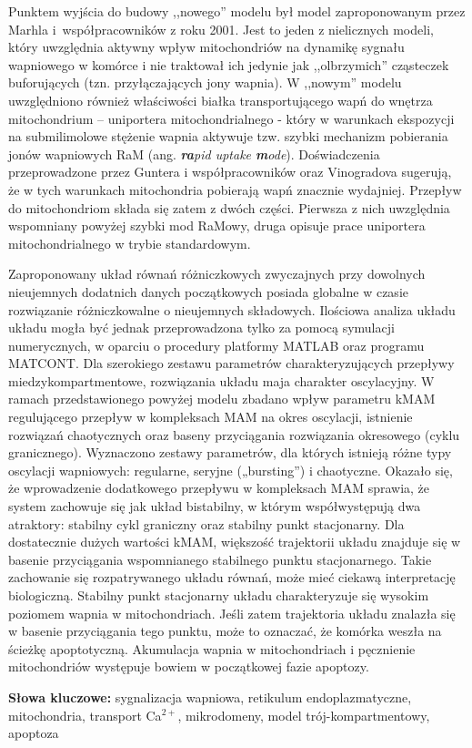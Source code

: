 Punktem wyjścia do budowy ,,nowego'' modelu był model zaproponowanym przez Marhla i~współpracowników z roku 2001. Jest to jeden z nielicznych modeli, który uwzględnia aktywny wpływ mitochondriów na dynamikę sygnału wapniowego w komórce i nie traktował ich jedynie jak ,,olbrzymich'' cząsteczek buforujących (tzn. przyłączających jony wapnia). W ,,nowym'' modelu uwzględniono również właściwości białka transportującego wapń do wnętrza mitochondrium – uniportera mitochondrialnego -  który w warunkach ekspozycji na submilimolowe stężenie wapnia aktywuje tzw. szybki mechanizm pobierania jonów wapniowych RaM (ang. \textit{\textbf{ra}pid uptake \textbf{m}ode}). Doświadczenia przeprowadzone przez Guntera i współpracowników oraz Vinogradova sugerują, że w tych warunkach mitochondria pobierają wapń znacznie wydajniej. Przepływ do mitochondriom składa się zatem z dwóch części. Pierwsza z nich uwzględnia wspomniany powyżej szybki mod RaMowy, druga opisuje prace uniportera mitochondrialnego w trybie standardowym.

Zaproponowany  układ równań różniczkowych zwyczajnych przy dowolnych nieujemnych dodatnich danych początkowych posiada globalne w czasie rozwiązanie różniczkowalne o nieujemnych składowych. Ilościowa analiza układu układu mogła być jednak przeprowadzona tylko za pomocą symulacji numerycznych, w oparciu o procedury platformy MATLAB oraz  programu MATCONT. 
Dla szerokiego zestawu parametrów charakteryzujących przepływy miedzykompartmentowe, rozwiązania układu maja charakter oscylacyjny. W ramach przedstawionego powyżej  modelu zbadano  wpływ parametru kMAM  regulującego przepływ w kompleksach MAM na okres oscylacji, istnienie rozwiązań chaotycznych oraz  baseny przyciągania rozwiązania okresowego (cyklu granicznego). Wyznaczono zestawy parametrów, dla których istnieją różne typy oscylacji wapniowych: regularne, seryjne („bursting”) i chaotyczne. Okazało się, że wprowadzenie dodatkowego przepływu w kompleksach MAM sprawia, że  system zachowuje się jak układ bistabilny, w którym współwystępują dwa atraktory: stabilny cykl graniczny oraz stabilny punkt stacjonarny. Dla dostatecznie dużych wartości kMAM, większość trajektorii układu znajduje się w basenie przyciągania wspomnianego stabilnego punktu stacjonarnego.  Takie zachowanie się rozpatrywanego układu równań, może mieć ciekawą interpretację biologiczną. Stabilny punkt stacjonarny układu charakteryzuje się wysokim poziomem wapnia w mitochondriach. Jeśli zatem trajektoria układu znalazła się w basenie przyciągania tego punktu, może to oznaczać, że komórka weszła na ścieżkę apoptotyczną. Akumulacja wapnia w mitochondriach i pęcznienie mitochondriów występuje bowiem w początkowej fazie apoptozy.

\bigskip
\noindent \textbf{Słowa kluczowe:} sygnalizacja wapniowa, retikulum endoplazmatyczne, mitochondria, transport Ca$^{2+}$, mikrodomeny, model trój-kompartmentowy, apoptoza


